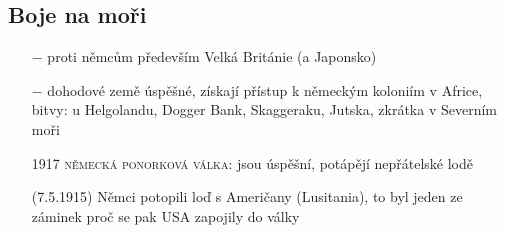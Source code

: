 \documentclass{article}
\begin{document}
\subsection*{Boje na moři}
\begin{itemize}
    \vspace{-0.5em}
    \setlength\itemsep{0.15em}
    \item[$-$] proti němcům především Velká Británie (a Japonsko)
    \item[$-$] dohodové země úspěšné, získají přístup k německým koloniím v Africe, bitvy: u Helgolandu, Dogger Bank, Skaggeraku, Jutska, zkrátka v Severním moři
    \item[1917] \textsc{německá ponorková válka}: jsou úspěšní, potápějí nepřátelské lodě
    \item[(7.5.1915)] Němci potopili loď s Američany (Lusitania), to byl jeden ze záminek proč se pak USA zapojily do války
\end{itemize}
\end{document}
